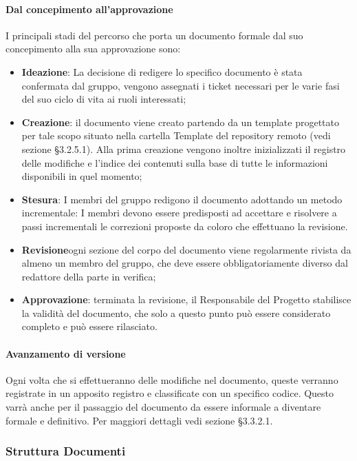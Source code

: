 			\paragraph{Dal concepimento all’approvazione }
				I principali stadi del percorso che porta un documento formale dal suo concepimento alla sua approvazione sono:
				\begin{itemize}
					\item\textbf{Ideazione}:  La decisione di redigere lo specifico documento è stata confermata dal gruppo, vengono assegnati i ticket necessari per le varie fasi del suo ciclo di vita ai ruoli interessati;
					\item\textbf{Creazione}: il documento viene creato partendo da un template progettato per tale scopo situato nella cartella Template del repository remoto (vedi sezione §3.2.5.1). Alla prima creazione vengono inoltre inizializzati il registro delle modifiche e l’indice dei contenuti sulla base di tutte le informazioni disponibili in quel momento;
					\item\textbf{Stesura}: I membri del gruppo redigono il documento adottando un metodo incrementale: I membri devono essere predisposti ad accettare e risolvere a passi incrementali le correzioni proposte da coloro che effettuano la revisione.
					\item\textbf{Revisione}ogni sezione del corpo del documento viene regolarmente rivista da almeno un membro del gruppo, che deve essere obbligatoriamente diverso dal redattore della parte in verifica;
					\item\textbf{Approvazione}: terminata la revisione, il Responsabile del Progetto stabilisce la validità del documento, che solo a questo punto può essere considerato completo e può essere rilasciato.
				\end{itemize}
			\paragraph{Avanzamento di versione}
				Ogni volta che si effettueranno delle modifiche nel documento, queste verranno registrate in un apposito registro e classificate con un specifico codice. Questo varrà anche per il passaggio del documento da essere informale a diventare formale e definitivo.
				Per maggiori dettagli vedi sezione §3.3.2.1.


		\subsubsection{Struttura Documenti}

